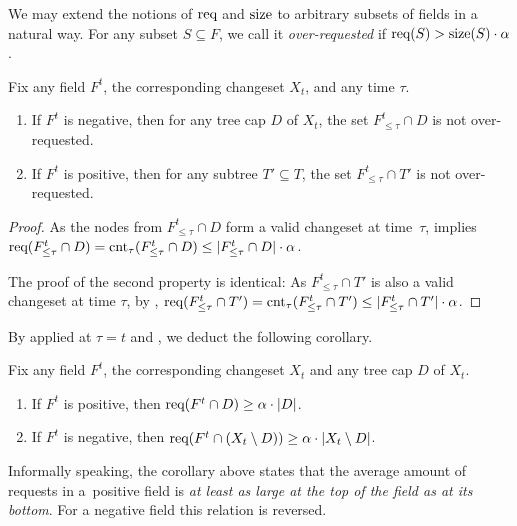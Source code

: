 We may extend the notions of $\textrm{req}$ and $\textrm{size}$ to arbitrary subsets of fields
in a natural way.
For any subset $S \subseteq F$, we call it \emph{over-requested} if
$\textrm{req}(S) > \textrm{size}(S) \cdot \alpha$. 

\begin{lemma}
\label{lem:not_over-requested}
Fix any field $F^t$, the corresponding changeset $X_t$, and any time $\tau$.
\begin{enumerate}
\item If $F^t$ is negative, then for any tree cap $D$ of $X_t$, the set
    $F^t_{\leq \tau} \cap D$ is not over-requested.
\item If $F^t$ is positive, then for any subtree $T' \subseteq T$, the set
    $F^t_{\leq \tau} \cap T'$ is not over-requested.
\end{enumerate}
\end{lemma}

\begin{proof} 
As the nodes from $F^t_{\leq \tau} \cap D$ form a valid changeset at time~$\tau$, 
 implies $\textrm{req}(F^t_{\leq
\tau} \cap D) = \textrm{cnt}_\tau(F^t_{\leq \tau} \cap D) \leq |F^t_{\leq \tau} \cap
D| \cdot \alpha$.

The proof of the second property is identical: As $F^t_{\leq \tau} \cap T'$ is
also a valid changeset at time $\tau$, by
, $\textrm{req}(F^t_{\leq \tau}
\cap T') = \textrm{cnt}_\tau(F^t_{\leq \tau} \cap T')
\leq |F^t_{\leq \tau} \cap T'| \cdot \alpha$. 
\end{proof}

By  applied at $\tau = t$ and
, we deduct the following corollary.

\begin{corollary}
\label{cor:density}
Fix any field $F^t$, the corresponding changeset $X_t$ and any tree
cap $D$ of $X_t$. 
\begin{enumerate}
\item If $F^t$ is positive, then $\textrm{req}(F^t \cap D) \geq \alpha \cdot |D|$.
\item If $F^t$ is negative, then $\textrm{req}(F^t \cap (X_t \setminus D)) \geq 
  \alpha \cdot \text{$|X_t \setminus D|$}$.
\end{enumerate}
\end{corollary} 

Informally speaking, the corollary above states that the average amount of
requests in a~positive field is \emph{at least as large at the top of the
field as at its bottom}. For a negative field this relation is reversed.


